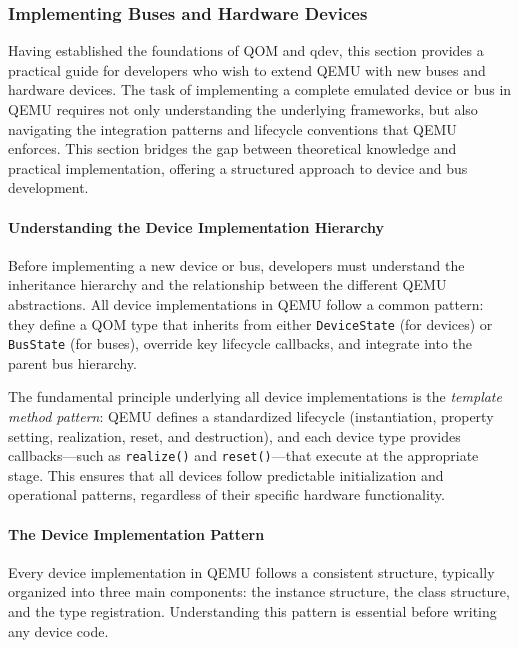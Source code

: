 \subsubsection{Implementing Buses and Hardware Devices}
\label{chap:device_implementation}

Having established the foundations of QOM and qdev, this section provides a practical guide for developers who wish to extend QEMU with new buses and hardware devices. The task of implementing a complete emulated device or bus in QEMU requires not only understanding the underlying frameworks, but also navigating the integration patterns and lifecycle conventions that QEMU enforces. This section bridges the gap between theoretical knowledge and practical implementation, offering a structured approach to device and bus development.

\paragraph{Understanding the Device Implementation Hierarchy}

Before implementing a new device or bus, developers must understand the inheritance hierarchy and the relationship between the different QEMU abstractions. All device implementations in QEMU follow a common pattern: they define a QOM type that inherits from either \texttt{DeviceState} (for devices) or \texttt{BusState} (for buses), override key lifecycle callbacks, and integrate into the parent bus hierarchy.

The fundamental principle underlying all device implementations is the \textit{template method pattern}: QEMU defines a standardized lifecycle (instantiation, property setting, realization, reset, and destruction), and each device type provides callbacks—such as \texttt{realize()} and \texttt{reset()}—that execute at the appropriate stage. This ensures that all devices follow predictable initialization and operational patterns, regardless of their specific hardware functionality.

\paragraph{The Device Implementation Pattern}

Every device implementation in QEMU follows a consistent structure, typically organized into three main components: the instance structure, the class structure, and the type registration. Understanding this pattern is essential before writing any device code.

